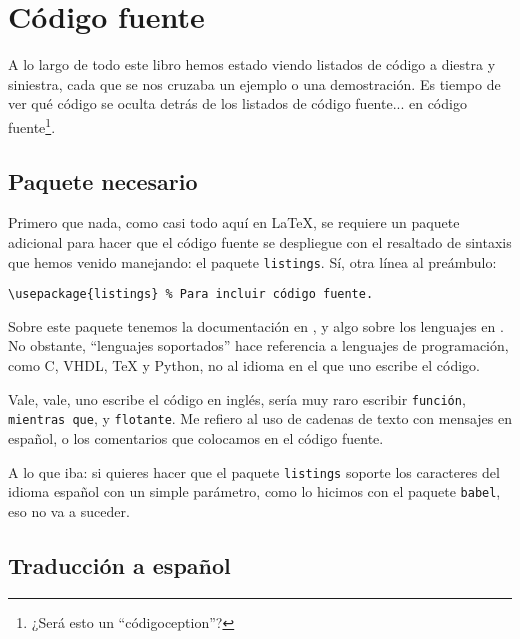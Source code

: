 \chapter{Código fuente}
\label{cha:codigo}



A lo largo de todo este libro hemos estado viendo listados de código a diestra y siniestra, cada que se nos cruzaba un ejemplo o una demostración. Es tiempo de ver qué código se oculta detrás de los listados de código fuente... en código fuente\footnote{¿Será esto un ``códigoception''?}.



\section{Paquete necesario}
\label{sec:paquete_necesario}



Primero que nada, como casi todo aquí en \LaTeX{}, se requiere un paquete adicional para hacer que el código fuente se despliegue con el resaltado de sintaxis que hemos venido manejando: el paquete \texttt{listings}. Sí, otra línea al preámbulo:

\begin{lstlisting}[style=latex]
\usepackage{listings} % Para incluir código fuente.
\end{lstlisting}

Sobre este paquete tenemos la documentación en \cite{bib:listings_package}, y algo sobre los lenguajes en \cite{bib:listings_language}. No obstante, ``lenguajes soportados'' hace referencia a lenguajes de programación, como C, VHDL, \TeX{} y Python, no al idioma en el que uno escribe el código.

Vale, vale, uno escribe el código en inglés, sería muy raro escribir \texttt{función}, \texttt{mientras que}, y \texttt{flotante}. Me refiero al uso de cadenas de texto con mensajes en español, o los comentarios que colocamos en el código fuente.

A lo que iba: si quieres hacer que el paquete \texttt{listings} soporte los caracteres del idioma español con un simple parámetro, como lo hicimos con el paquete \texttt{babel}, eso no va a suceder.



\section{Traducción a español}
\label{sec:codigo_traduccion}



